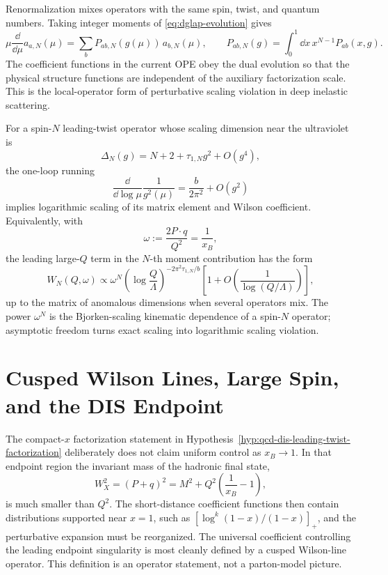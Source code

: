 Renormalization mixes operators with the same spin, twist, and quantum
numbers.  Taking integer moments of \eqref{eq:dglap-evolution} gives
\[
  \mu\frac{\dd}{\dd\mu}a_{a,N}(\mu)
  =
  \sum_b P_{ab,N}(g(\mu))\,a_{b,N}(\mu),
  \qquad
  P_{ab,N}(g)=\int_0^1\dd x\,x^{N-1}P_{ab}(x,g).
\]
The coefficient functions in the current OPE obey the dual evolution so that
the physical structure functions are independent of the auxiliary
factorization scale.  This is the local-operator form of perturbative
scaling violation in deep inelastic scattering.

For a spin-\(N\) leading-twist operator whose scaling dimension near the
ultraviolet is
\[
  \Delta_N(g)=N+2+\tau_{1,N}g^2+O(g^4),
\]
the one-loop running
\[
  \frac{\dd}{\dd\log\mu}\frac1{g^2(\mu)}
  =
  \frac{b}{2\pi^2}+O(g^2)
\]
implies logarithmic scaling of its matrix element and Wilson coefficient.
Equivalently, with
\[
  \omega:=\frac{2P\cdot q}{Q^2}=\frac1{x_B},
\]
the leading large-\(Q\) term in the \(N\)-th moment contribution has the form
\begin{equation}
  W_N(Q,\omega)
  \propto
  \omega^N
  \left(
    \log\frac{Q}{\Lambda}
  \right)^{-2\pi^2\tau_{1,N}/b}
  \left[1+O\!\left(\frac1{\log(Q/\Lambda)}\right)\right],
  \label{eq:qcd-dis-logarithmic-scaling-violation}
\end{equation}
up to the matrix of anomalous dimensions when several operators mix.  The
power \(\omega^N\) is the Bjorken-scaling kinematic dependence of a spin-\(N\)
operator; asymptotic freedom turns exact scaling into logarithmic scaling
violation.

\section{Cusped Wilson Lines, Large Spin, and the DIS Endpoint}
\label{sec:qcd-cusped-wilson-lines-large-spin}

The compact-\(x\) factorization statement in
Hypothesis~\ref{hyp:qcd-dis-leading-twist-factorization} deliberately does not
claim uniform control as \(x_B\to1\).  In that endpoint region the invariant
mass of the hadronic final state,
\[
  W_X^2=(P+q)^2
  =
  M^2+Q^2\left(\frac1{x_B}-1\right),
\]
is much smaller than \(Q^2\).  The short-distance coefficient functions then
contain distributions supported near \(x=1\), such as
\([\log^k(1-x)/(1-x)]_+\), and the perturbative expansion must be reorganized.
The universal coefficient controlling the leading endpoint singularity is
most cleanly defined by a cusped Wilson-line operator.  This definition is an
operator statement, not a parton-model picture.

